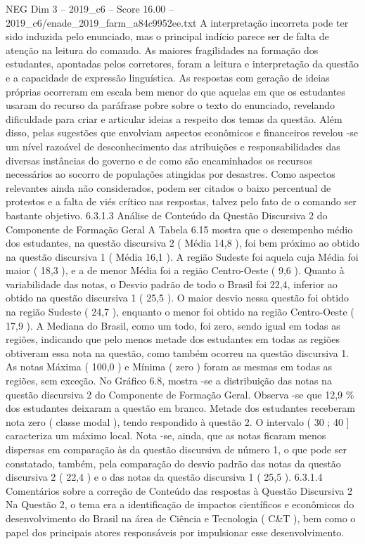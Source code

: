 \begin{textsample}{NEG Dim 3 – 2019\_c6 – Score 16.00 – 2019\_c6/enade\_2019\_farm\_a84c9952ee.txt}
A interpretação incorreta pode ter sido induzida pelo enunciado, mas o principal indício parece ser de falta de atenção na leitura do comando.
As maiores fragilidades na formação dos estudantes, apontadas pelos corretores, foram a leitura e interpretação da questão e a capacidade de expressão linguística.
As respostas com geração de ideias próprias ocorreram em escala bem menor do que aquelas em que os estudantes usaram do recurso da paráfrase pobre sobre o texto do enunciado, revelando dificuldade para criar e articular ideias a respeito dos temas da questão.
Além disso, pelas sugestões que envolviam aspectos econômicos e financeiros revelou -se um nível razoável de desconhecimento das atribuições e responsabilidades das diversas instâncias do governo e de como são encaminhados os recursos necessários ao socorro de populações atingidas por desastres.
Como aspectos relevantes ainda não considerados, podem ser citados o baixo percentual de protestos e a falta de viés crítico nas respostas, talvez pelo fato de o comando ser bastante objetivo. 6.3.1.3 Análise de Conteúdo da Questão Discursiva 2 do Componente de Formação Geral A Tabela 6.15 mostra que o desempenho médio dos estudantes, na questão discursiva 2 ( Média 14,8 ), foi bem próximo ao obtido na questão discursiva 1 ( Média 16,1 ).
A região Sudeste foi aquela cuja Média foi maior ( 18,3 ), e a de menor Média foi a região Centro-Oeste ( 9,6 ).
Quanto à variabilidade das notas, o Desvio padrão de todo o Brasil foi 22,4, inferior ao obtido na questão discursiva 1 ( 25,5 ).
O maior desvio nessa questão foi obtido na região Sudeste ( 24,7 ), enquanto o menor foi obtido na região Centro-Oeste ( 17,9 ).
A Mediana do Brasil, como um todo, foi zero, sendo igual em todas as regiões, indicando que pelo menos metade dos estudantes em todas as regiões obtiveram essa nota na questão, como também ocorreu na questão discursiva 1.
As notas Máxima ( 100,0 ) e Mínima ( zero ) foram as mesmas em todas as regiões, sem exceção.
No Gráfico 6.8, mostra -se a distribuição das notas na questão discursiva 2 do Componente de Formação Geral.
Observa -se que 12,9 \% dos estudantes deixaram a questão em branco.
Metade dos estudantes receberam nota zero ( classe modal ), tendo respondido à questão 2.
O intervalo ( 30 ; 40 ] caracteriza um máximo local.
Nota -se, ainda, que as notas ficaram menos dispersas em comparação às da questão discursiva de número 1, o que pode ser constatado, também, pela comparação do desvio padrão das notas da questão discursiva 2 ( 22,4 ) e o das notas da questão discursiva 1 ( 25,5 ). 6.3.1.4 Comentários sobre a correção de Conteúdo das respostas à Questão Discursiva 2 Na Questão 2, o tema era a identificação de impactos científicos e econômicos do desenvolvimento do Brasil na área de Ciência e Tecnologia ( C\&T ), bem como o papel dos principais atores responsáveis por impulsionar esse desenvolvimento.

\end{textsample}
